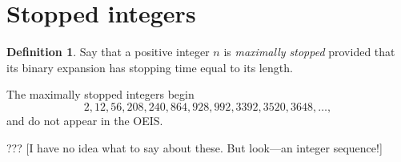 \documentclass[12pt]{amsart}
\theoremstyle{definition}
\newtheorem{definition}{Definition}
\begin{document}
\section{Stopped integers}%
\label{sec:stopped_integers}

\begin{definition}
    Say that a positive integer $n$ is \emph{maximally stopped} provided that
    its binary expansion has stopping time equal to its length.
\end{definition}

The maximally stopped integers begin
\begin{equation*}
    2, 12, 56, 208, 240, 864, 928, 992, 3392, 3520, 3648, \dots,
\end{equation*}
and do not appear in the OEIS.

??? [I have no idea what to say about these. But look---an integer sequence!]
\end{document}

